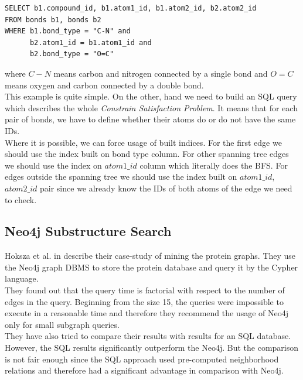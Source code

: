 \begin{verbatim}
SELECT b1.compound_id, b1.atom1_id, b1.atom2_id, b2.atom2_id
FROM bonds b1, bonds b2
WHERE b1.bond_type = "C-N" and
      b2.atom1_id = b1.atom1_id and 
      b2.bond_type = "O=C"
\end{verbatim}

\noindent where $ C-N $ means carbon and nitrogen connected by a single bond and $ O=C $ means oxygen and carbon connected by a double bond.\\

This example is quite simple. On the other, hand we need to build an SQL query which describes the whole \textit{Constrain Satisfaction Problem}. It means that for each pair of bonds, we have to define whether their atoms do or do not have the same IDs.\\

Where it is possible, we can force usage of built indices. For the first edge we should use the index built on bond type column. For other spanning tree edges we should use the index on $ atom1\_id $ column which literally does the BFS. For edges outside the spanning tree we should use the index built on $ atom1\_id $, $ atom2\_id $ pair since we already know the IDs of both atoms of the edge we need to check.

\subsection{Neo4j Substructure Search}

Hoksza et al. in \cite{Hoksza} describe their case-study of mining the protein graphs. They use the Neo4j graph DBMS to store the protein database and query it by the Cypher language.\\

They found out that the query time is factorial with respect to the number of edges in the query. Beginning from the size 15, the queries were impossible to execute in a reasonable time and therefore they recommend the usage of Neo4j only for small subgraph queries.\\

They have also tried to compare their results with results for an SQL database. However, the SQL results significantly outperform the Neo4j. But the comparison is not fair enough since the SQL approach used pre-computed neighborhood relations and therefore had a significant advantage in comparison with Neo4j.\\

